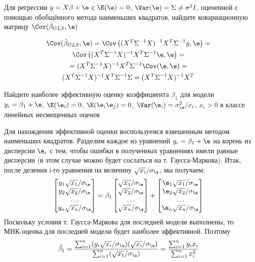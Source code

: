 \documentclass[pdftex,11pt,openany]{book}\usepackage[]{graphicx}\usepackage[]{color}
\begin{document}
\begin{problem}
Для регрессии $y = X\beta + \e$ с $\E(\e) = 0$, $\Var(\e) = \Sigma \neq \sigma^2 I$, оцененной с помощью обобщённого метода наименьших квадратов, найдите ковариационную матрицу $\Cov(\hat{\beta}_{GLS}, \e)$
\end{problem}


\begin{solution}
\begin{multline}
\Cov(\hat{\beta}_{GLS}, \e) = \Cov \left( (X^T \Sigma^{-1} X)^{-1} X^T \Sigma^{-1} y, \e \right) = \\
\Cov \left( (X^T \Sigma^{-1} X)^{-1} X^T \Sigma^{-1} \e, \e \right) = \\ = (X^T \Sigma^{-1} X)^{-1} X^T \Sigma^{-1} \Cov(\e, \e) =\\
 (X^T \Sigma^{-1} X)^{-1} X^T \Sigma^{-1} \Sigma = (X^T \Sigma^{-1} X)^{-1} X^T
\end{multline}
\end{solution}


\begin{problem}
Найдите наиболее эффективную оценку коэффициента $\beta_1$ для модели $y_i = \beta_1 + \e$, $\E(\e_i) = 0$, $\E(\e_i\e_j) = 0$, $\Var(\e_i) = \sigma_{\e}^2 / x_i$, $x_i > 0$ в классе линейных несмещенных оценок
\end{problem}

\begin{solution}
Для нахождения эффективной оценки воспользуемся взвешенным методом наименьших квадратов. Разделим каждое из уравнений $y_i = \beta_1 + \e$ на корень из дисперсии $\e_i$ с тем, чтобы ошибки в полученных уравнениях имели равные дисперсии (в этом случае можно будет сослаться на т. Гаусса-Маркова). Итак, после деления i-го уравнения на величину $\sqrt{x_i}/\sigma_{\e}$, мы получаем:
$$\begin{bmatrix}
y_1 \sqrt{x_1}/\sigma_{\e} \\
y_2 \sqrt{x_2}/\sigma_{\e} \\
\ldots \\
y_n \sqrt{x_n}/\sigma_{\e} \\
\end{bmatrix} = \beta_1 \begin{bmatrix}
\sqrt{x_1}/\sigma_{\e} \\
\sqrt{x_2}/\sigma_{\e} \\
\ldots \\
\sqrt{x_n}/\sigma_{\e} \\
\end{bmatrix} + \begin{bmatrix}
\e_1 \sqrt{x_1}/\sigma_{\e} \\
\e_2 \sqrt{x_2}/\sigma_{\e} \\
\ldots \\
\e_n \sqrt{x_n}/\sigma_{\e} \\
\end{bmatrix}$$
Поскольку условия т. Гаусса-Маркова для последней модели выполнены, то МНК-оценка для последней модели будет наиболее эффективной. Поэтому
$$\hat{\beta_1} = \frac{\sum_{i=1}^n (y_i \sqrt{x_i}/\sigma_{\e})(\sqrt{x_i}/\sigma_{\e})}{\sum_{i=1}^n (\sqrt{x_1}/\sigma_{\e})} = \frac{\sum_{i=1}^n y_i x_i}{\sum_{i=1}^n x_i^2}$$
\end{solution}
\end{document}
